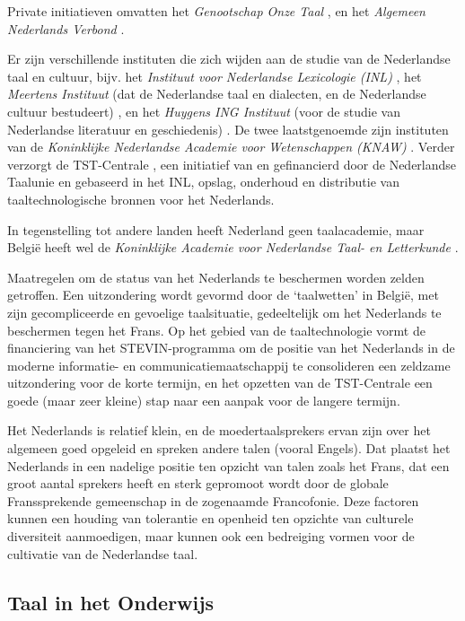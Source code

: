 \documentclass[]{../../metanetpaper}
\begin{document}
\begin{multicols}{2}
   Private initiatieven omvatten het \emph{Genootschap Onze Taal} \cite{OT}, en het \emph{Algemeen Nederlands Verbond} \cite{ANV}.

   Er zijn verschillende instituten die zich wijden aan de studie van de Nederlandse taal en cultuur, bijv. het \emph{Instituut voor Nederlandse Lexicologie (INL)} \cite{INL}, het \emph{Meertens Instituut} (dat de Nederlandse taal en dialecten, en de Nederlandse cultuur bestudeert) \cite{MI}, en het \emph{Huygens ING Instituut} (voor de studie van Nederlandse literatuur en geschiedenis) \cite{HING}. De twee laatstgenoemde zijn instituten van de \emph{Koninklijke Nederlandse Academie voor Wetenschappen (KNAW)} \cite{KNAW}.  Verder verzorgt de TST-Centrale \cite{TST-Centrale}, een initiatief van en gefinancierd door de Nederlandse Taalunie en gebaseerd in het INL, opslag, onderhoud en distributie van taaltechnologische bronnen voor het Nederlands.

   In tegenstelling tot andere landen heeft Nederland geen taalacademie, maar Belgi{\"e} heeft wel de \emph{Koninklijke Academie voor Nederlandse Taal- en Letterkunde} \cite{Kantl}.


   Maatregelen om de status van het Nederlands te beschermen worden zelden getroffen. Een uitzondering wordt gevormd door de `taalwetten' in Belgi{\"e}, met zijn gecompliceerde en gevoelige taalsituatie, gedeeltelijk om het Nederlands te beschermen tegen het Frans. Op het gebied van de taaltechnologie vormt de financiering van het STEVIN-programma om de positie van het Nederlands in de moderne informatie- en communicatiemaatschappij te consolideren een zeldzame uitzondering voor de korte termijn, en het opzetten van de TST-Centrale een goede (maar zeer kleine) stap naar een aanpak voor de langere termijn.

   Het Nederlands is relatief klein, en de moedertaalsprekers ervan zijn over het algemeen goed opgeleid en spreken andere talen (vooral Engels). Dat plaatst het Nederlands in een nadelige positie ten opzicht van talen zoals het Frans, dat een groot aantal sprekers heeft en sterk gepromoot wordt door de globale Franssprekende gemeenschap in de zogenaamde Francofonie. Deze factoren kunnen een houding van tolerantie en openheid ten opzichte van culturele diversiteit aanmoedigen, maar kunnen ook een bedreiging vormen voor de cultivatie van de Nederlandse taal.

\subsection{Taal in het Onderwijs}


\end{multicols}
\end{document}
